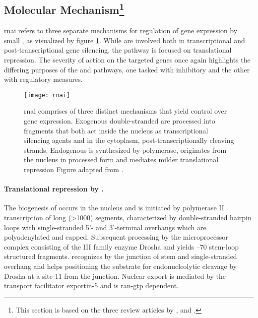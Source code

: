 \subsection{Molecular Mechanism\footnote{This section is based on the three review articles by \citet{Wilson2013}, \citet{Kim2007} and \citet{Carthew2009}.}}
\acrlong{rnai} refers to three separate mechanisms for regulation of gene expression by small , as visualized by figure \ref{fig:rnai}. While  are involved both in transcriptional and post-transcriptional gene silencing, the  pathway is focused on translational repression. The severity of action on the targeted genes once again highlights the differing purposes of the  and  pathways, one tasked with inhibitory and the other with regulatory measures.

\begin{figure}[t]
  \centering
  \texttt{[image: rnai]}
  \caption[The three major pathways of \acrlong{rnai}.]{\acrlong{rnai} comprises of three distinct mechanisms that yield control over gene expression. Exogenous double-stranded  are processed into  fragments that both act inside the nucleus as transcriptional silencing agents and in the cytoplasm, post-transcriptionally cleaving  strands. Endogenous  is synthesized by  polymerase, originates from the nucleus in processed form and mediates milder translational repression Figure adapted from \citet{Kim2007}.}
  \label{fig:rnai}
\end{figure}

\paragraph{Translational repression by .}
The biogenesis of  occurs in the nucleus and is initiated by  polymerase II transcription of long (\textgreater \SI{1000}{\nucleotide})  segments, characterized by double-stranded hairpin loops with single-stranded 5'- and 3'-terminal overhangs which are poly\-adenylated and capped. Subsequent processing by the microprocessor complex consisting of the  III family enzyme Drosha and  yields --\SI{70}{\nucleotide} stem-loop structured  fragments.  recognizes  by the junction of stem and single-stranded overhang and helps positioning the substrate for endonucleolytic cleavage by Drosha at a site \tilde \SI{11}{\nucleotide} from the junction. Nuclear export is mediated by the transport facilitator exportin-5 and is \acrshort{ran}-\acrshort{gtp} dependent.


